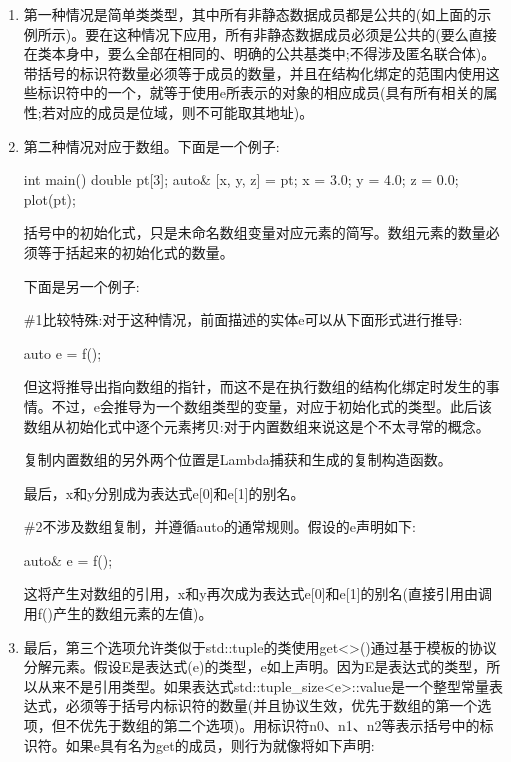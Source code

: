 \begin{enumerate}
\item
第一种情况是简单类类型，其中所有非静态数据成员都是公共的(如上面的示例所示)。要在这种情况下应用，所有非静态数据成员必须是公共的(要么直接在类本身中，要么全部在相同的、明确的公共基类中;不得涉及匿名联合体)。带括号的标识符数量必须等于成员的数量，并且在结构化绑定的范围内使用这些标识符中的一个，就等于使用e所表示的对象的相应成员(具有所有相关的属性;若对应的成员是位域，则不可能取其地址)。

\item
第二种情况对应于数组。下面是一个例子:

\begin{cpp}
int main() {
	double pt[3];
	auto& [x, y, z] = pt;
	x = 3.0; y = 4.0; z = 0.0;
	plot(pt);
}
\end{cpp}

括号中的初始化式，只是未命名数组变量对应元素的简写。数组元素的数量必须等于括起来的初始化式的数量。

下面是另一个例子:


\#1比较特殊:对于这种情况，前面描述的实体e可以从下面形式进行推导:

\begin{cpp}
auto e = f();
\end{cpp}

但这将推导出指向数组的指针，而这不是在执行数组的结构化绑定时发生的事情。不过，e会推导为一个数组类型的变量，对应于初始化式的类型。此后该数组从初始化式中逐个元素拷贝:对于内置数组来说这是个不太寻常的概念。

\begin{notice}
复制内置数组的另外两个位置是Lambda捕获和生成的复制构造函数。
\end{notice}

最后，x和y分别成为表达式e[0]和e[1]的别名。

\#2不涉及数组复制，并遵循auto的通常规则。假设的e声明如下:

\begin{cpp}
auto& e = f();
\end{cpp}

这将产生对数组的引用，x和y再次成为表达式e[0]和e[1]的别名(直接引用由调用f()产生的数组元素的左值)。

\item
最后，第三个选项允许类似于std::tuple的类使用get<>()通过基于模板的协议分解元素。假设E是表达式(e)的类型，e如上声明。因为E是表达式的类型，所以从来不是引用类型。如果表达式std::tuple\_size<e>::value是一个整型常量表达式，必须等于括号内标识符的数量(并且协议生效，优先于数组的第一个选项，但不优先于数组的第二个选项)。用标识符n0、n1、n2等表示括号中的标识符。如果e具有名为get的成员，则行为就像将如下声明:


\end{enumerate}
